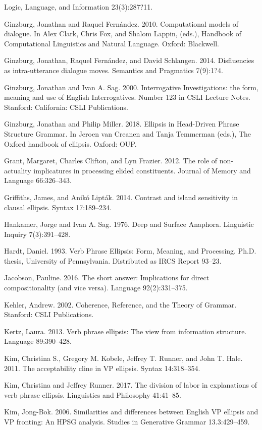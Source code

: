 \documentclass[output=paper]{langsci/langscibook}
\begin{document}
\begin{description}
Logic, Language, and Information 23(3):287?11.
\item Ginzburg, Jonathan and Raquel Fern\'{a}ndez. 2010. Computational models of dialogue. In Alex
Clark, Chris Fox, and Shalom Lappin, (eds.), Handbook of Computational Linguistics and
Natural Language. Oxford: Blackwell.
\item Ginzburg, Jonathan, Raquel Fern\'{a}ndez, and David Schlangen. 2014. Disfluencies as
intra-utterance dialogue moves. Semantics and Pragmatics 7(9):1?4.
\item Ginzburg, Jonathan and Ivan A. Sag. 2000. Interrogative Investigations: the form, meaning
and use of English Interrogatives. Number 123 in CSLI Lecture Notes. Stanford:
California: CSLI Publications.
\item Ginzburg, Jonathan and Philip Miller. 2018. Ellipsis in Head-Driven Phrase Structure Grammar. In Jeroen van Creanen and Tanja Temmerman (eds.), The Oxford handbook of ellipsis. Oxford: OUP.
\item Grant, Margaret, Charles Clifton, and Lyn Frazier. 2012. The role of non-actuality
implicatures in processing elided constituents. Journal of Memory and Language
66:326--343.
\item Griffiths, James, and Anik\'{o} Lipt\'{a}k. 2014. Contrast and island sensitivity in clausal ellipsis. Syntax 17:189--234.
\item Hankamer, Jorge and Ivan A. Sag. 1976. Deep and Surface Anaphora. Linguistic
Inquiry 7(3):391--428.
\item Hardt, Daniel. 1993. Verb Phrase Ellipsis: Form, Meaning, and Processing. Ph.D. thesis,
University of Pennsylvania. Distributed as IRCS Report 93--23.
\item Jacobson, Pauline. 2016. The short answer: Implications for direct compositionality (and vice
versa). Language 92(2):331--375.
\item Kehler, Andrew. 2002. Coherence, Reference, and the Theory of Grammar. Stanford: CSLI
Publications.
\item Kertz, Laura. 2013. Verb phrase ellipsis: The view from information structure. Language
89:390--428.
\item Kim, Christina S., Gregory M. Kobele, Jeffrey T. Runner, and John T. Hale. 2011. The
acceptability cline in VP ellipsis. Syntax 14:318--354.
\item Kim, Christina and Jeffrey Runner. 2017. The division of labor in explanations of verb phrase ellipsis. Linguistics and Philosophy 41:41--85.
\item Kim, Jong-Bok. 2006. Similarities and differences between English VP ellipsis and VP fronting: An HPSG analysis. Studies in Generative Grammar 13.3:429--459.

\end{description}
\end{document}
